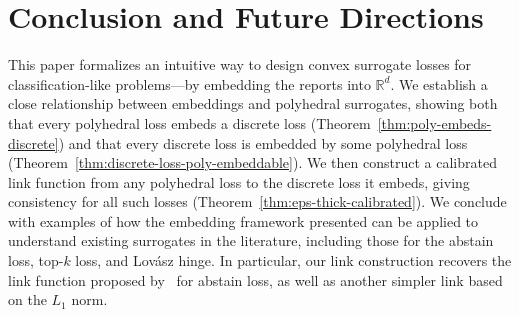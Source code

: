 \documentclass[12pt]{article}
\newcommand{\Comments}{1}
\newcommand{\mytodo}[2]{\ifnum\Comments=1%
  \todo[linecolor=#1!80!black,backgroundcolor=#1,bordercolor=#1!80!black]{#2}\fi}
\newcommand{\jessiet}[1]{\mytodo{purple!20!white}{JF: #1}}
\newcommand{\reals}{\mathbb{R}}
\newcommand{\prop}[1]{\mathrm{prop}[#1]}
\newcommand{\simplex}{\Delta_\Y}
\newcommand{\Y}{\mathcal{Y}}
\newcommand{\inprod}[2]{\langle #1, #2 \rangle}%
\newcommand{\elltopk}{\ell^{\text{top-$k$}}}
\begin{document}
%
%
%
%

\section{Conclusion and Future Directions} \label{sec:conclusion}
This paper formalizes an intuitive way to design convex surrogate losses for classification-like problems---by embedding the reports into $\reals^d$.
We establish a close relationship between embeddings and polyhedral surrogates, showing both that every polyhedral loss embeds a discrete loss (Theorem~\ref{thm:poly-embeds-discrete}) and that every discrete loss is embedded by some polyhedral loss (Theorem~\ref{thm:discrete-loss-poly-embeddable}).
We then construct a calibrated link function from any polyhedral loss to the discrete loss it embeds, giving consistency for all such losses (Theorem~\ref{thm:eps-thick-calibrated}).
We conclude with examples of how the embedding framework presented can be applied to understand existing surrogates in the literature, including those for the abstain loss, top-$k$ loss, and Lov\'asz hinge.
In particular, our link construction recovers the link function proposed by~\citet{ramaswamy2018consistent} for abstain loss, as well as another simpler link based on the $L_1$ norm.
\end{document}
